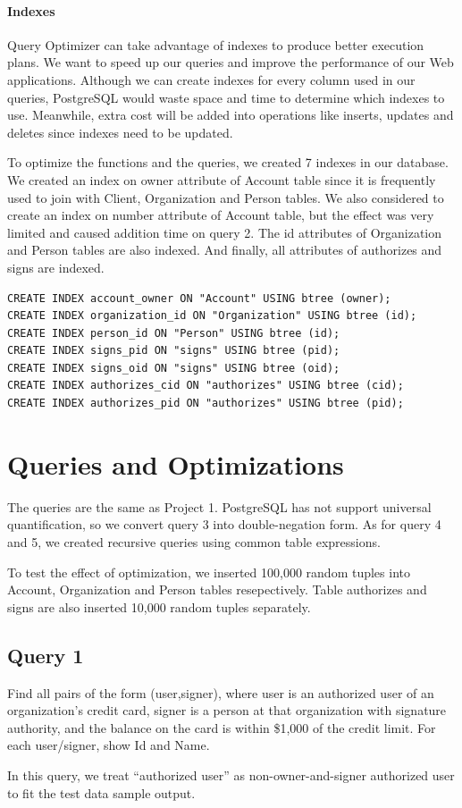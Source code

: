 \documentclass[11pt]{article}
\begin{document}
\paragraph{Indexes} Query Optimizer can take advantage of indexes to produce better execution plans. We want to speed up our queries and improve the performance of our Web applications. Although we can create indexes for every column used in our queries, PostgreSQL would waste space and time to determine which indexes to use. Meanwhile, extra cost will be added into operations like inserts, updates and deletes since indexes need to be updated.
\par
To optimize the functions and the queries, we created 7 indexes in our database. We created an index on owner attribute of Account table since it is frequently used to join with Client, Organization and Person tables. We also considered to create an index on number attribute of Account table, but the effect was very limited and caused addition time on query 2. The id attributes of Organization and Person tables are also indexed. And finally, all attributes of authorizes and signs are indexed.

\begin{verbatim}
CREATE INDEX account_owner ON "Account" USING btree (owner);
CREATE INDEX organization_id ON "Organization" USING btree (id);
CREATE INDEX person_id ON "Person" USING btree (id);
CREATE INDEX signs_pid ON "signs" USING btree (pid);
CREATE INDEX signs_oid ON "signs" USING btree (oid);
CREATE INDEX authorizes_cid ON "authorizes" USING btree (cid);
CREATE INDEX authorizes_pid ON "authorizes" USING btree (pid);
\end{verbatim}

\section{Queries and Optimizations}
\label{sec:qando}
The queries are the same as Project 1. PostgreSQL has not support universal quantification, so we convert query 3 into double-negation form. As for query 4 and 5, we created recursive queries using common table expressions.
\par
To test the effect of optimization, we inserted 100,000 random tuples into Account, Organization and Person tables resepectively. Table authorizes and signs are also inserted 10,000 random tuples separately.

\subsection{Query 1}
Find all pairs of the form (user,signer), where user is an authorized user of an organization's credit card, signer is a person at that organization with signature authority, and the balance on the card is within \$1,000 of the credit limit. For each user/signer, show Id and Name.
\par
In this query, we treat ``authorized user'' as non-owner-and-signer authorized user to fit the test data sample output.
\end{document}
